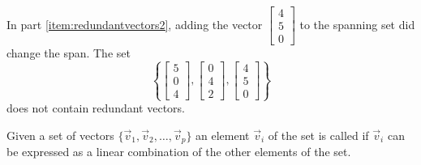 \documentclass{ximera}
\begin{document}

In part \ref{item:redundantvectors2}, adding the vector $\begin{bmatrix}4\\5\\0\end{bmatrix}$ to the spanning set did change the span. The set 
$$\left\{\begin{bmatrix}5\\0\\4\end{bmatrix}, \begin{bmatrix}0\\4\\2\end{bmatrix},\begin{bmatrix}4\\5\\0\end{bmatrix}\right\}$$ does not contain redundant vectors.

\begin{definition}\label{def:redundant}
Given a set of vectors $\{\vec{v}_1,\vec{v}_2,\ldots ,\vec{v}_p\}$ an element $\vec{v}_i$ of the set is called  if $\vec{v}_i$ can be expressed as a linear combination of the other elements of the set.  
\end{definition}
\end{document}

